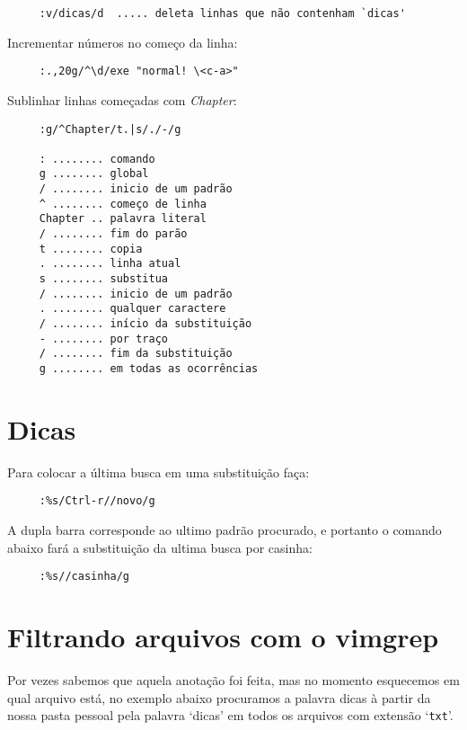 \begin{verbatim}
     :v/dicas/d  ..... deleta linhas que não contenham `dicas'
\end{verbatim}

Incrementar números no começo da linha:

\begin{verbatim}
     :.,20g/^\d/exe "normal! \<c-a>"
\end{verbatim}

Sublinhar linhas começadas com {\em Chapter}:

\begin{verbatim}
     :g/^Chapter/t.|s/./-/g

     : ........ comando
     g ........ global
     / ........ inicio de um padrão
     ^ ........ começo de linha
     Chapter .. palavra literal
     / ........ fim do parão
     t ........ copia
     . ........ linha atual
     s ........ substitua
     / ........ inicio de um padrão
     . ........ qualquer caractere
     / ........ início da substituição
     - ........ por traço
     / ........ fim da substituição
     g ........ em todas as ocorrências
\end{verbatim}

\section{Dicas }
Para colocar a última busca em uma substituição faça:

\begin{verbatim}
     :%s/Ctrl-r//novo/g
\end{verbatim}

A dupla barra corresponde ao ultimo padrão procurado, e portanto o
comando abaixo fará a substituição da ultima busca por casinha:

\begin{verbatim}
     :%s//casinha/g
\end{verbatim}

\section{Filtrando arquivos com o vimgrep}
\label{Filtrando arquivos com o vimgrep}

Por vezes sabemos que aquela anotação foi feita, mas no momento esquecemos em qual
arquivo está, no exemplo abaixo procuramos a palavra dicas à partir da nossa pasta pessoal
pela palavra `dicas' em todos os arquivos com extensão `{\tt txt}'.

